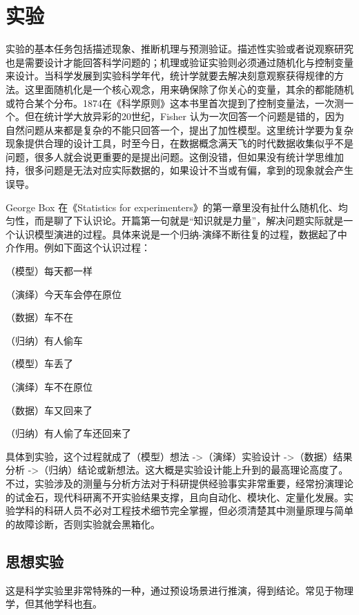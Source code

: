 \documentclass[]{tufte-book}
\begin{document}
\hypertarget{exp}{%
\chapter{实验}\label{exp}}

实验的基本任务包括描述现象、推断机理与预测验证。描述性实验或者说观察研究也是需要设计才能回答科学问题的；机理或验证实验则必须通过随机化与控制变量来设计。当科学发展到实验科学年代，统计学就要去解决刻意观察获得规律的方法。这里面随机化是一个核心观念，用来确保除了你关心的变量，其余的都能随机或符合某个分布。1874在《科学原则》这本书里首次提到了控制变量法，一次测一个。但在统计学大放异彩的20世纪，Fisher 认为一次回答一个问题是错的，因为自然问题从来都是复杂的不能只回答一个，提出了加性模型。这里统计学要为复杂现象提供合理的设计工具，时至今日，在数据概念满天飞的时代数据收集似乎不是问题，很多人就会说更重要的是提出问题。这倒没错，但如果没有统计学思维加持，很多问题是无法对应实际数据的，如果设计不当或有偏，拿到的现象就会产生误导。

George Box 在《Statistics for experimenters》的第一章里没有扯什么随机化、均匀性，而是聊了下认识论。开篇第一句就是``知识就是力量''，解决问题实际就是一个认识模型演进的过程。具体来说是一个归纳-演绎不断往复的过程，数据起了中介作用。例如下面这个认识过程：

（模型）每天都一样

（演绎）今天车会停在原位

（数据）车不在

（归纳）有人偷车

（模型）车丢了

（演绎）车不在原位

（数据）车又回来了

（归纳）有人偷了车还回来了

具体到实验，这个过程就成了（模型）想法 -\textgreater（演绎）实验设计 -\textgreater（数据）结果分析 -\textgreater（归纳）结论或新想法。这大概是实验设计能上升到的最高理论高度了。不过，实验涉及的测量与分析方法对于科研提供经验事实非常重要，经常扮演理论的试金石，现代科研离不开实验结果支撑，且向自动化、模块化、定量化发展。实验学科的科研人员不必对工程技术细节完全掌握，但必须清楚其中测量原理与简单的故障诊断，否则实验就会黑箱化。

\hypertarget{ux601dux60f3ux5b9eux9a8c}{%
\section{思想实验}\label{ux601dux60f3ux5b9eux9a8c}}

这是科学实验里非常特殊的一种，通过预设场景进行推演，得到结论。常见于物理学，但其他学科也\href{https://zh.wikipedia.org/wiki/\%E6\%80\%9D\%E6\%83\%B3\%E5\%AF\%A6\%E9\%A9\%97}{有}。
\end{document}
